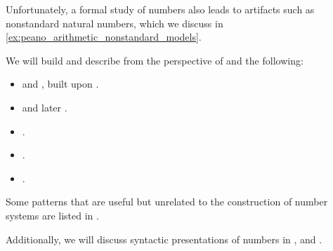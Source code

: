 Unfortunately, a formal study of numbers also leads to artifacts such as nonstandard natural numbers, which we discuss in \cref{ex:peano_arithmetic_nonstandard_models}.

We will build and describe from the perspective of  and  the following:
\begin{itemize}
  \item {} and , built upon .
  \item {} and later .
  \item {}.
  \item {}.
  \item {}.
\end{itemize}

Some patterns that are useful but unrelated to the construction of number systems are listed in .

Additionally, we will discuss syntactic presentations of numbers in ,  and .
